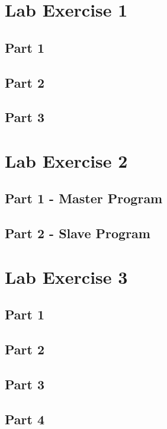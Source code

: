 \begin{appendices}
	\label{Appendix:start}
	\section{Lab Exercise 1}
	{
		\subsection{Part 1}
		{
			\label{appendix:ex1-1}
			
		}
		\subsection{Part 2}
		{
			\label{appendix:ex1-2}
			
		}
		\subsection{Part 3}
		{
			\label{appendix:ex1-3}
			
		}
	}
	\section{Lab Exercise 2}
	{
		\label{appendix:ex2}
		\subsection{Part 1 - Master Program}
		{
			\label{appendix:ex2-1}
			
		}
		\subsection{Part 2 - Slave Program}
		{
			\label{appendix:ex2-2}
			
		}
	}
	\section{Lab Exercise 3}
	{
		\subsection{Part 1}
		{
			\label{appendix:ex3-1}
			
		}
		\subsection{Part 2}
		{
			\label{appendix:ex3-2}
			
		}
		\subsection{Part 3}
		{
			\label{appendix:ex3-3}
			
		}
		\subsection{Part 4}
		{
			\label{appendix:ex3-4}
			
		}
	}

\end{appendices}